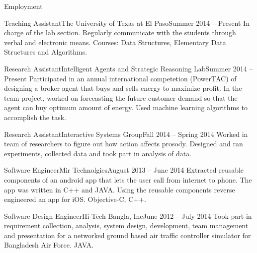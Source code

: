 \documentclass[]{mcdowellcv}
\begin{document}
	\makeheader
	
	\begin{cvsection}{Employment}
		\begin{cvsubsection}{Teaching Assistant}{The University of Texas at El Paso}{Summer 2014 -- Present}
		In charge of the lab section. Regularly communicate with the students through verbal and electronic means. Courses: Data Structures, Elementary Data Structures and Algorithms. 
		\end{cvsubsection}
		\begin{cvsubsection}{Research Assistant}{Intelligent Agents and Strategic Reasoning Lab}{Summer 2014 -- Present}
			Participated in an annual international competetion (PowerTAC) of designing a broker agent that buys and sells energy to maximize profit. In the team project, worked on forecasting the future customer demand so that the agent can buy optimum amount of energy. Used machine learning algorithms to accomplish the task.
			
		\end{cvsubsection}
		
		\begin{cvsubsection}{Research Assistant}{Interactive Systems Group}{Fall 2014 -- Spring 2014}
			Worked in team of researchers to figure out how action affects prosody. 
			Designed and ran experiments, collected data and took part in analysis of data. 
		\end{cvsubsection}
		
		\begin{cvsubsection}{Software Engineer}{Mir Technolgies}{August 2013 -- June 2014}
			Extracted reusable components of an android app that lets the user call from internet to phone. The app was written in C++ and JAVA. Using the reusable components reverse engineered an app for iOS. Objective-C, C++. 
		\end{cvsubsection}
		
		\begin{cvsubsection}{Software Design Engineer}{Hi-Tech Bangla, Inc}{June 2012 -- July 2014}	
			Took part in requirement collection, analysis, system design, development, team management and presentation for a networked ground based air traffic controller simulator for Bangladesh Air Force. JAVA.
			
		\end{cvsubsection}
	\end{cvsection}
	
\end{document}

